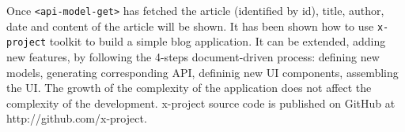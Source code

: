 Once \texttt{<api-model-get>} has fetched the article (identified by id), title, author, date and content of the article will be shown. It has been shown how to use \texttt{x-project} toolkit to build a simple blog application. It can be extended, adding new features, by following the 4-steps document-driven process: defining new models, generating corresponding API, defininig new UI components, assembling the UI. The growth of the complexity of the application does not affect the complexity of the development. x-project source code is published on GitHub at http://github.com/x-project.

